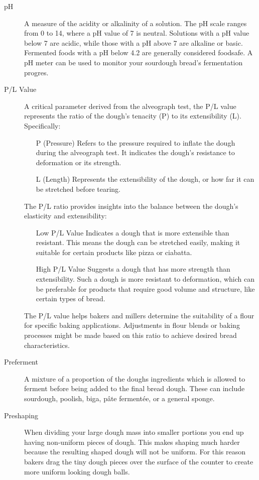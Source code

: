 \begin{description}
\item[pH] A measure of the acidity or alkalinity of a solution. The pH scale
ranges from 0 to 14, where a pH value of 7 is neutral. Solutions with a pH value below
7 are acidic, while those with a pH above 7 are alkaline or basic. Fermented
foods with a pH below 4.2 are generally considered foodsafe. A pH meter can be
used to monitor your sourdough bread's fermentation progres.

\item[P/L Value] A critical parameter derived from the alveograph test, the P/L
value represents the ratio of the dough's tenacity (P) to its extensibility (L).
Specifically:
\begin{itemize}
\item[P (Pressure)] Refers to the pressure required to inflate the dough
    during the alveograph test. It indicates the dough's resistance to deformation or
    its strength.
\item[L (Length)] Represents the extensibility of the dough, or how far it
    can be stretched before tearing.
\end{itemize}
The P/L ratio provides insights into the balance between the dough's elasticity and
extensibility:

\begin{itemize}
\item[Low P/L Value] Indicates a dough that is more extensible than
  resistant. This means the dough can be stretched easily, making it suitable for
  certain products like pizza or ciabatta.
\item[High P/L Value] Suggests a dough that has more strength than
  extensibility. Such a dough is more resistant to deformation, which can be
  preferable for products that require good volume and structure, like certain types
  of bread.
\end{itemize}
The P/L value helps bakers and millers determine the suitability of a flour for
specific baking applications. Adjustments in flour blends or baking processes might
be made based on this ratio to achieve desired bread characteristics.

\item[Preferment] A mixture of a proportion of the doughs ingredients which is
allowed to ferment before being added to the final bread dough. These can include
sourdough, poolish, biga, pâte fermentée, or a general sponge.

\item[Preshaping] When dividing your large dough mass into smaller portions you end
up having non-uniform pieces of dough. This makes shaping much harder because the
resulting shaped dough will not be uniform. For this reason bakers drag the tiny dough
pieces over the surface of the counter to create more uniform looking dough balls.


\end{description}
